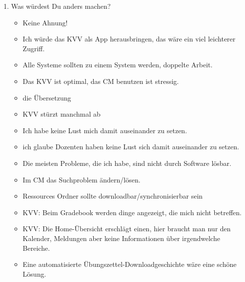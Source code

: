 \documentclass{article}
\begin{document}
\begin{enumerate}
\item Was würdest Du anders machen?
\begin{itemize}
\item Keine Ahnung!
\item Ich würde das KVV als App herausbringen, das wäre ein viel leichterer Zugriff.
\item Alle Systeme sollten zu einem System werden, doppelte Arbeit.
\item Das KVV ist optimal, das CM benutzen ist stressig.
\item die Übersetzung
\item KVV stürzt manchmal ab
\item Ich habe keine Lust mich damit auseinander zu setzen.
\item ich glaube Dozenten haben keine Lust sich damit auseinander zu setzen.
\item Die meisten Probleme, die ich habe, sind nicht durch Software lösbar.
\item Im CM das Suchproblem ändern/lösen.
\item Ressources Ordner sollte downloadbar/synchronisierbar sein
\item KVV: Beim Gradebook werden dinge angezeigt, die mich nicht betreffen.
\item KVV: Die Home-Übersicht erschlägt einen, hier braucht man nur den Kalender, Meldungen aber keine Informationen über irgendwelche Bereiche.
\item Eine automatisierte Übungszettel-Downloadgeschichte wäre eine schöne Lösung.
\end{itemize}


\end{enumerate}
\end{document}
